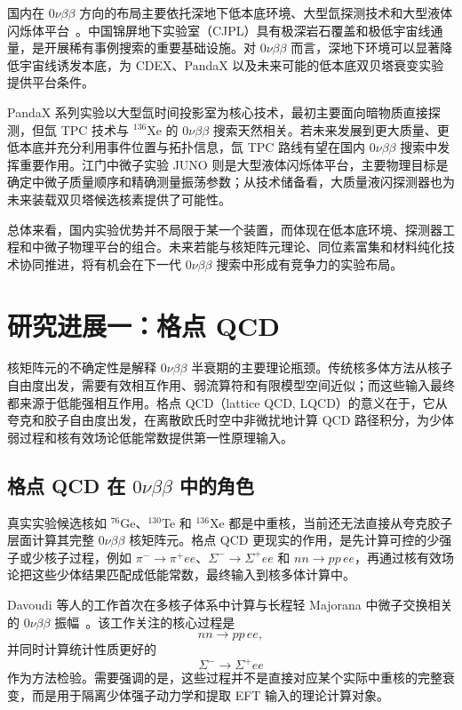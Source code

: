 \documentclass[12pt,a4paper]{ctexart}
\begin{document}
国内在 $0\nu\beta\beta$ 方向的布局主要依托深地下低本底环境、大型氙探测技术和大型液体闪烁体平台~\cite{Wang2024}。中国锦屏地下实验室（CJPL）具有极深岩石覆盖和极低宇宙线通量，是开展稀有事例搜索的重要基础设施。对 $0\nu\beta\beta$ 而言，深地下环境可以显著降低宇宙线诱发本底，为 CDEX、PandaX 以及未来可能的低本底双贝塔衰变实验提供平台条件。

PandaX 系列实验以大型氙时间投影室为核心技术，最初主要面向暗物质直接探测，但氙 TPC 技术与 $^{136}$Xe 的 $0\nu\beta\beta$ 搜索天然相关。若未来发展到更大质量、更低本底并充分利用事件位置与拓扑信息，氙 TPC 路线有望在国内 $0\nu\beta\beta$ 搜索中发挥重要作用。江门中微子实验 JUNO 则是大型液体闪烁体平台，主要物理目标是确定中微子质量顺序和精确测量振荡参数；从技术储备看，大质量液闪探测器也为未来装载双贝塔候选核素提供了可能性。

总体来看，国内实验优势并不局限于某一个装置，而体现在低本底环境、探测器工程和中微子物理平台的组合。未来若能与核矩阵元理论、同位素富集和材料纯化技术协同推进，将有机会在下一代 $0\nu\beta\beta$ 搜索中形成有竞争力的实验布局。

\section{研究进展一：格点 QCD}

核矩阵元的不确定性是解释 $0\nu\beta\beta$ 半衰期的主要理论瓶颈。传统核多体方法从核子自由度出发，需要有效相互作用、弱流算符和有限模型空间近似；而这些输入最终都来源于低能强相互作用。格点 QCD（lattice QCD, LQCD）的意义在于，它从夸克和胶子自由度出发，在离散欧氏时空中非微扰地计算 QCD 路径积分，为少体弱过程和核有效场论低能常数提供第一性原理输入。

\subsection{格点 QCD 在 \texorpdfstring{$0\nu\beta\beta$}{0nu beta beta} 中的角色}

真实实验候选核如 $^{76}$Ge、$^{130}$Te 和 $^{136}$Xe 都是中重核，当前还无法直接从夸克胶子层面计算其完整 $0\nu\beta\beta$ 核矩阵元。格点 QCD 更现实的作用，是先计算可控的少强子或少核子过程，例如 $\pi^-\to\pi^+ee$、$\Sigma^-\to\Sigma^+ee$ 和 $nn\to pp\,ee$，再通过核有效场论把这些少体结果匹配成低能常数，最终输入到核多体计算中。

Davoudi 等人的工作首次在多核子体系中计算与长程轻 Majorana 中微子交换相关的 $0\nu\beta\beta$ 振幅~\cite{Davoudi2024}。该工作关注的核心过程是
\begin{equation}
	nn\rightarrow pp\,ee,
\end{equation}
并同时计算统计性质更好的
\begin{equation}
	\Sigma^-\rightarrow \Sigma^+ee
\end{equation}
作为方法检验。需要强调的是，这些过程并不是直接对应某个实际中重核的完整衰变，而是用于隔离少体强子动力学和提取 EFT 输入的理论计算对象。
\end{document}

